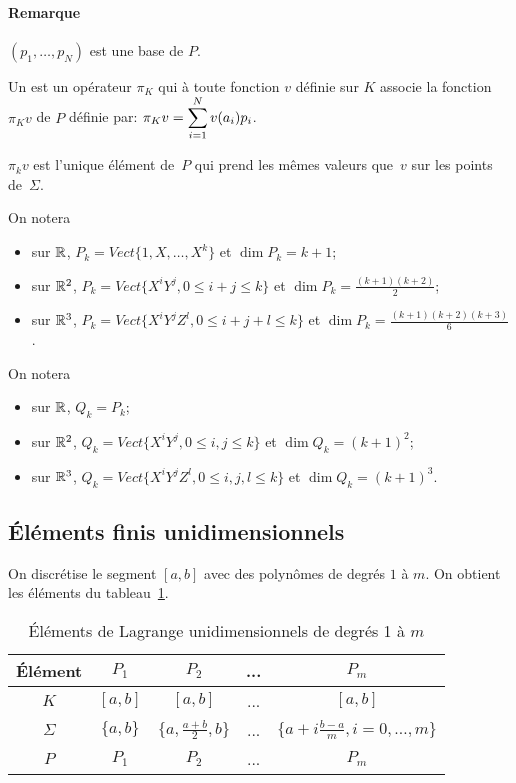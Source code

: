 \medskip
\paragraph{Remarque} $(p_1,\ldots, p_N)$ est une base de $P$.

\medskip
\begin{definition}
Un  est un opérateur $\pi_K$
qui à toute fonction $v$ définie sur $K$ associe la fonction $\pi_Kv$ de $P$ définie par:
$\pi_Kv=\displaystyle\sum_{i=1}^N v(a_i)p_i$.
\end{definition}

\begin{theoreme}
$\pi_kv$ est l'unique élément de~$P$ qui prend les mêmes valeurs que~$v$ sur les
points de~$\Sigma$.
\end{theoreme}

\medskip
On notera 
\begin{itemize}
\item sur $\mathbb R$, $P_k=Vect\{1, X,\ldots, X^k\}$ et $\dim P_k=k+1$;
\item sur $\mathbb R^2$, $P_k=Vect\{X^iY^j, 0\le i+j\le k\}$ et $\dim P_k=\frac{(k+1)(k+2)}2$;
\item sur $\mathbb R^3$, $P_k=Vect\{X^iY^jZ^l, 0\le i+j+l\le k\}$ et $\dim P_k=\frac{(k+1)(k+2)(k+3)}6$.
\end{itemize}
\medskip
On notera 
\begin{itemize}
\item sur $\mathbb R$, $Q_k=P_k$;
\item sur $\mathbb R^2$, $Q_k=Vect\{X^iY^j, 0\le i,j\le k\}$ et $\dim Q_k=(k+1)^2$;
\item sur $\mathbb R^3$, $Q_k=Vect\{X^iY^jZ^l, 0\le i,j,l\le k\}$ et $\dim Q_k=(k+1)^3$.
\end{itemize}



\medskip
\subsection*{Éléments finis unidimensionnels}

On discrétise le segment $[a,b]$ avec des polynômes de degrés $1$ à $m$.
On obtient les éléments du tableau~\ref{tab:Elem:uni}.
\begin{table}[ht]\centering\small
\begin{tabular}{c|cccc}
Élément & $P_1$ & $P_2$ & ... & $P_m$\\
\hline
$K$	      & $[a,b]$ &  $[a,b]$ & ... & $[a,b]$\\
$\Sigma$   & $\{a,b\}$ & $\{a,\frac{a+b}2, b\}$& ... &$\{a+i\frac{b-a}m, i=0,\ldots, m\}$\\
$P$            & $P_1$ & $P_2$ & ... & $P_m$\\
\hline
\end{tabular}
\caption{Éléments de Lagrange unidimensionnels de degrés 1 à $m$}\label{tab:Elem:uni}
\end{table}

